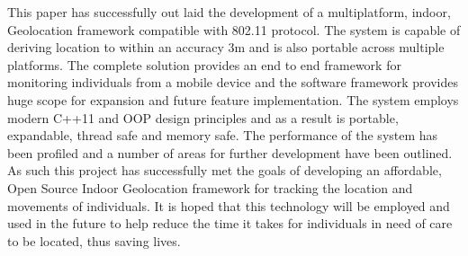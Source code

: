 \documentclass[conference]{IEEEtran}
\begin{document}
This paper has successfully out laid the development of a multiplatform, indoor, Geolocation framework compatible with 802.11 protocol. The system is capable of deriving location to within an accuracy 3m and is also portable across multiple platforms. The complete solution provides an end to end framework for monitoring individuals from a mobile device and the software framework provides huge scope for expansion and future feature implementation. The system employs modern C++11 and OOP design principles and as a result is portable, expandable, thread safe and memory safe. The performance of the system has been profiled and a number of areas for further development have been outlined. As such this project has successfully met the goals of developing an affordable, Open Source Indoor Geolocation framework for tracking the location and movements of individuals. It is hoped that this technology will be employed and used in the future to help reduce the time it takes for individuals in need of care to be located, thus saving lives.
\printbibliography
\end{document}
